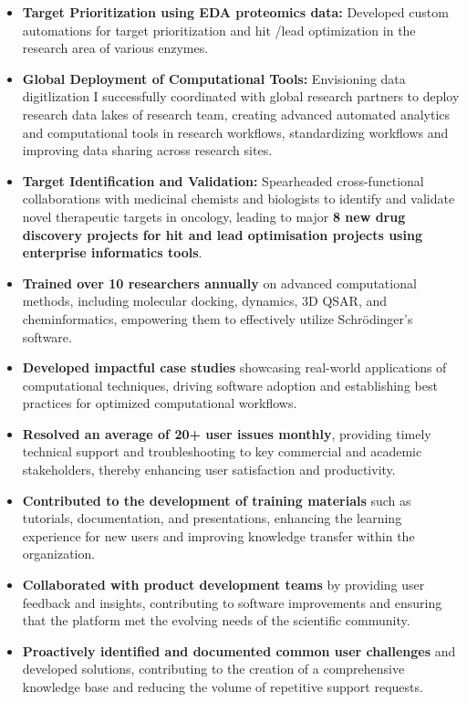 \documentclass[10pt,a4paper,ragged2e,withhyper]{altacv}
\begin{document}
\begin{itemize}
    \item \textbf{Target Prioritization using EDA proteomics data:} Developed custom automations for target prioritization and hit /lead optimization in the research area of various enzymes.
    \item \textbf{Global Deployment of Computational Tools:} Envisioning data digitlization I successfully coordinated with global research partners to deploy research data lakes of research team, creating advanced automated analytics and computational tools in research workflows, standardizing workflows and improving data sharing across research sites.
    \item \textbf{Target Identification and Validation:} Spearheaded cross-functional collaborations with medicinal chemists and biologists to identify and validate novel therapeutic targets in oncology, leading to major \textbf{8 new drug discovery projects for hit and lead optimisation projects using enterprise informatics tools}.
\end{itemize}

\begin{itemize}
    \item \textbf{Trained over 10 researchers annually} on advanced computational methods, including molecular docking, dynamics, 3D QSAR, and cheminformatics, empowering them to effectively utilize Schrödinger's software.
    \item \textbf{Developed impactful case studies} showcasing real-world applications of computational techniques, driving software adoption and establishing best practices for optimized computational workflows.
    \item \textbf{Resolved an average of 20+ user issues monthly}, providing timely technical support and troubleshooting to key commercial and academic stakeholders, thereby enhancing user satisfaction and productivity.
    \item \textbf{Contributed to the development of training materials} such as tutorials, documentation, and presentations, enhancing the learning experience for new users and improving knowledge transfer within the organization.
    \item \textbf{Collaborated with product development teams} by providing user feedback and insights, contributing to software improvements and ensuring that the platform met the evolving needs of the scientific community.
    \item \textbf{Proactively identified and documented common user challenges} and developed solutions, contributing to the creation of a comprehensive knowledge base and reducing the volume of repetitive support requests.
\end{itemize}
\end{document}
